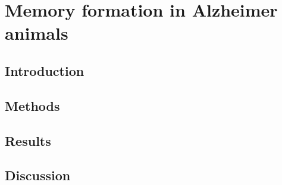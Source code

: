 \chapter{Memory formation in Alzheimer animals}
\section{Introduction}
\section{Methods}
\section{Results}
\section{Discussion}
